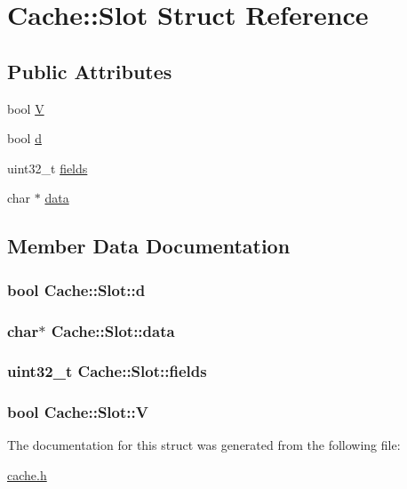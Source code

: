\hypertarget{struct_cache_1_1_slot}{\section{Cache\-:\-:Slot Struct Reference}
\label{struct_cache_1_1_slot}
}
\subsection*{Public Attributes}
\begin{DoxyCompactItemize}
\item 
bool \hyperlink{struct_cache_1_1_slot_aeef3eb61b5d5a22d33b1527f5aeb5f58}{V}
\item 
bool \hyperlink{struct_cache_1_1_slot_a5d063b755eb48c9a2ad4ebd89c5d9334}{d}
\item 
uint32\-\_\-t \hyperlink{struct_cache_1_1_slot_a87d55805a2fd684a3fae8d94576b6404}{fields}
\item 
char $\ast$ \hyperlink{struct_cache_1_1_slot_a52e02e6ecaba1e608c14449ce249245d}{data}
\end{DoxyCompactItemize}


\subsection{Member Data Documentation}
\hypertarget{struct_cache_1_1_slot_a5d063b755eb48c9a2ad4ebd89c5d9334}{
\subsubsection[{d}]{\setlength{\rightskip}{0pt plus 5cm}bool {\bf Cache\-::\-Slot\-::d}}}\label{struct_cache_1_1_slot_a5d063b755eb48c9a2ad4ebd89c5d9334}
\hypertarget{struct_cache_1_1_slot_a52e02e6ecaba1e608c14449ce249245d}{
\subsubsection[{data}]{\setlength{\rightskip}{0pt plus 5cm}char$\ast$ {\bf Cache\-::\-Slot\-::data}}}\label{struct_cache_1_1_slot_a52e02e6ecaba1e608c14449ce249245d}
\hypertarget{struct_cache_1_1_slot_a87d55805a2fd684a3fae8d94576b6404}{
\subsubsection[{fields}]{\setlength{\rightskip}{0pt plus 5cm}uint32\-\_\-t {\bf Cache\-::\-Slot\-::fields}}}\label{struct_cache_1_1_slot_a87d55805a2fd684a3fae8d94576b6404}
\hypertarget{struct_cache_1_1_slot_aeef3eb61b5d5a22d33b1527f5aeb5f58}{
\subsubsection[{V}]{\setlength{\rightskip}{0pt plus 5cm}bool {\bf Cache\-::\-Slot\-::\-V}}}\label{struct_cache_1_1_slot_aeef3eb61b5d5a22d33b1527f5aeb5f58}


The documentation for this struct was generated from the following file\-:\begin{DoxyCompactItemize}
\item 
\hyperlink{cache_8h}{cache.\-h}\end{DoxyCompactItemize}
